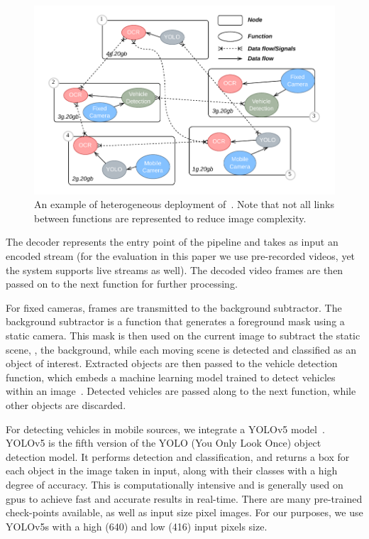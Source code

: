 \begin{figure}
	\centering
	\includegraphics[width=\linewidth]{chapters/videojam/images/videojam_example_of_deployment.pdf}
	\caption{An example of heterogeneous deployment of~\videojam{}. Note that not all links between functions are represented to reduce image complexity.}
	\label{fig:example_deployment}
\end{figure}

The decoder represents the entry point of the pipeline and takes as input an encoded stream (for the evaluation in this paper we use pre-recorded videos, yet the system supports live streams as well). The decoded video frames are then passed on to the next function for further processing.

For fixed cameras, frames are transmitted to the background subtractor. The background subtractor is a function that generates a foreground mask using a static camera. This mask is then used on the current image to subtract the static scene, \ie, the background, while each moving scene is detected and classified as an object of interest. Extracted objects are then passed to the vehicle detection function, which embeds a machine learning model trained to detect vehicles within an image~\cite{vehicle_detection}. Detected vehicles are passed along to the next function, while other objects are discarded.

For detecting vehicles in mobile sources, we integrate a YOLOv5 model~\cite{jocher2020yolov5}. YOLOv5 is the fifth version of the YOLO (You Only Look Once) object detection model. It performs detection and classification, and returns a box for each object in the image taken in input, along with their classes with a high degree of accuracy. This is computationally intensive and is generally used on \acrshort{gpu}s to achieve fast and accurate results in real-time. There are many pre-trained check-points available, as well as input size pixel images. For our purposes, we use YOLOv5s with a high (640) and low (416) input pixels size. 

